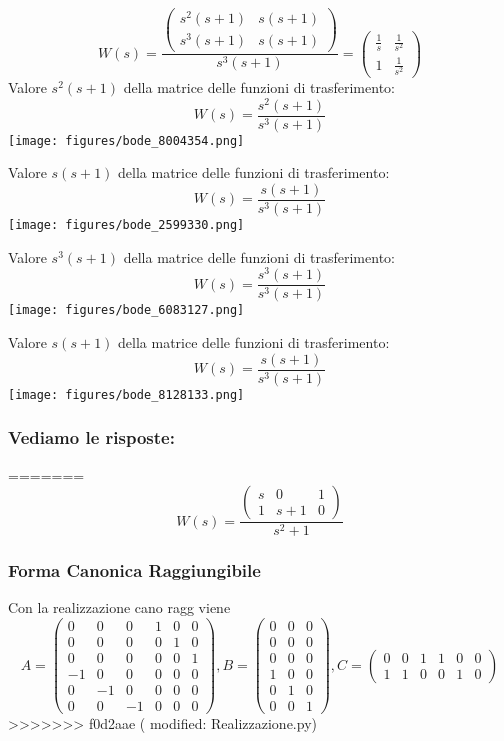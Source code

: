 \documentclass{article}
\begin{document}
\[ W(s)  =  \frac{\left(\begin{matrix}s^{2} \left(s + 1\right) & s \left(s + 1\right)\\s^{3} \left(s + 1\right) & s \left(s + 1\right)\end{matrix}\right)}{s^{3} \left(s + 1\right)} = \left(\begin{matrix}\frac{1}{s} & \frac{1}{s^{2}}\\1 & \frac{1}{s^{2}}\end{matrix}\right)  \] 
Valore $ s^{2} \left(s + 1\right) $ della matrice delle funzioni di trasferimento:
\[ W(s) = \frac{s^{2} \left(s + 1\right)}{s^{3} \left(s + 1\right)} \]\texttt{[image: figures/bode\_8004354.png]}


Valore $ s \left(s + 1\right) $ della matrice delle funzioni di trasferimento:
\[ W(s) = \frac{s \left(s + 1\right)}{s^{3} \left(s + 1\right)} \]\texttt{[image: figures/bode\_2599330.png]}


Valore $ s^{3} \left(s + 1\right) $ della matrice delle funzioni di trasferimento:
\[ W(s) = \frac{s^{3} \left(s + 1\right)}{s^{3} \left(s + 1\right)} \]\texttt{[image: figures/bode\_6083127.png]}


Valore $ s \left(s + 1\right) $ della matrice delle funzioni di trasferimento:
\[ W(s) = \frac{s \left(s + 1\right)}{s^{3} \left(s + 1\right)} \]\texttt{[image: figures/bode\_8128133.png]}


\subsubsection{Vediamo le risposte:} 
=======
\[ W(s) = \frac{\left(\begin{matrix}s & 0 & 1\\1 & s + 1 & 0\end{matrix}\right)}{s^{2} + 1} \]
\subsubsection{Forma Canonica Raggiungibile}
Con la realizzazione cano ragg viene \[ A = \left(\begin{matrix}0 & 0 & 0 & 1 & 0 & 0\\0 & 0 & 0 & 0 & 1 & 0\\0 & 0 & 0 & 0 & 0 & 1\\-1 & 0 & 0 & 0 & 0 & 0\\0 & -1 & 0 & 0 & 0 & 0\\0 & 0 & -1 & 0 & 0 & 0\end{matrix}\right), B = \left(\begin{matrix}0 & 0 & 0\\0 & 0 & 0\\0 & 0 & 0\\1 & 0 & 0\\0 & 1 & 0\\0 & 0 & 1\end{matrix}\right), C= \left(\begin{matrix}0 & 0 & 1 & 1 & 0 & 0\\1 & 1 & 0 & 0 & 1 & 0\end{matrix}\right) \]
>>>>>>> f0d2aae (	modified:   Realizzazione.py)
\end{document}
